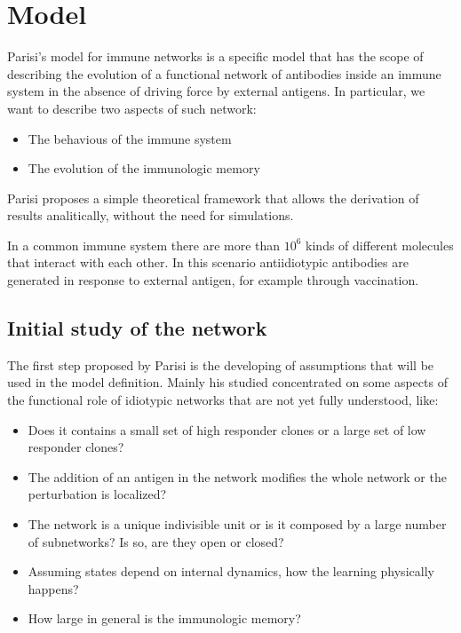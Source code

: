 \section{Model}

Parisi's model for immune networks is a specific model that has the scope of describing the evolution of a functional network of antibodies inside an immune system in the absence of driving force by external antigens.
In particular, we want to describe two aspects of such network:
\begin{itemize}
    \item The behavious of the immune system
    \item The evolution of the immunologic memory
\end{itemize}

Parisi proposes a simple theoretical framework that allows the derivation of results analitically, without the need for simulations.

In a common immune system there are more than $10^6$ kinds of different molecules that interact with each other. In this scenario antiidiotypic antibodies are generated in response to external antigen, for example through vaccination.

\subsection{Initial study of the network}

The first step proposed by Parisi is the developing of assumptions that will be used in the model definition. Mainly his studied concentrated on some aspects of the functional role of idiotypic networks that are not yet fully understood, like:
\begin{itemize}
    \item Does it contains a small set of high responder clones or a large set of low responder clones?
    \item The addition of an antigen in the network modifies the whole network or the perturbation is localized?
    \item The network is a unique indivisible unit or is it composed by a large number of subnetworks? Is so, are they open or closed?
    \item Assuming states depend on internal dynamics, how the learning physically happens?
    \item How large in general is the immunologic memory?
\end{itemize}

